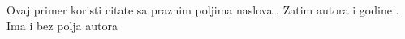 \documentclass{article}
\begin{document}
Ovaj primer koristi citate sa praznim poljima naslova \cite{knjigaPrazno}. Zatim autora i godine \cite{clanakPrazno}.
Ima i bez polja autora\cite{zurnal}



\end{document}
